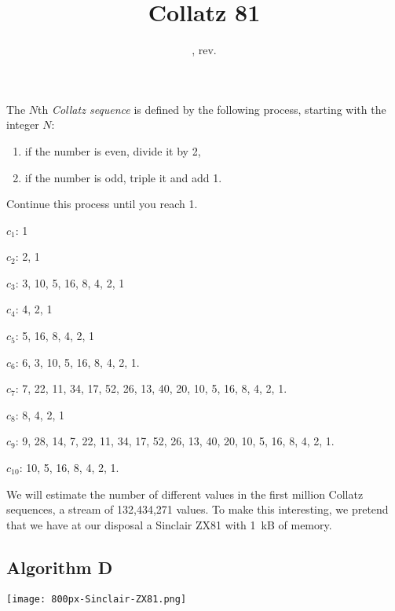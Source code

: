 \documentclass{tufte-handout}
\title{Collatz 81}
\date{\GITAuthorDate, rev. \GITAbrHash}
\author{}
\begin{document}
\maketitle




\bigskip\noindent
The $N$th \emph{Collatz sequence} is defined by the following process,
starting with the integer $N$:
\begin{enumerate}
\item if the number is even, divide it by 2,
\item if the number is odd, triple it and add 1.
\end{enumerate}
Continue this process until you reach 1.
\begin{marginfigure}
$c_1$: 1

\noindent $c_2$: 2, 1

\noindent $c_3$: 3, 10, 5, 16, 8, 4, 2, 1

\noindent $c_4$: 4, 2, 1

\noindent $c_5$: 5, 16, 8, 4, 2, 1

\noindent $c_6$: 6, 3, 10,
5, 16, 8, 4, 2, 1.

\noindent $c_7$: 7, 22, 11, 34, 17, 52, 26, 13, 40, 20, 10,
5, 16, 8, 4, 2, 1.

\noindent $c_8$: 8, 4, 2, 1

\noindent $c_9$: 9, 28, 14, 7, 22, 11, 34, 17, 52, 26, 13, 40, 20, 10,
5, 16, 8, 4, 2, 1.

\noindent $c_{10}$:  10,
5, 16, 8, 4, 2, 1.

\end{marginfigure}
\medskip
We will estimate the number of different values in the first million
Collatz sequences, a stream of 132,434,271 values.
To make this interesting, we pretend that we have at our disposal a
Sinclair ZX81 with 1~kB of memory.


\subsection{Algorithm D}

\begin{marginfigure}
\texttt{[image: 800px-Sinclair-ZX81.png]}
\end{marginfigure}
\end{document}
